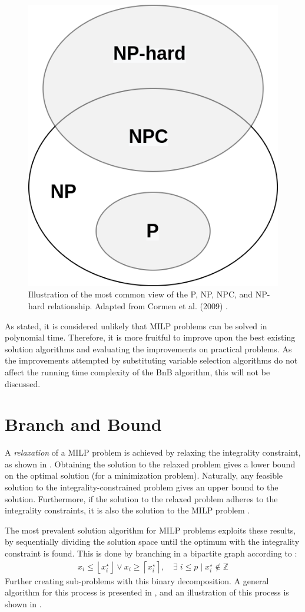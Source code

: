 \begin{figure}
    \centering
    \includegraphics[width=0.4\linewidth]{img/npc.png}
    \caption{\label{fig:np}Illustration of the most common view of the P, NP, NPC, and NP-hard relationship. Adapted from Cormen et al. (2009) \cite{cormen2009introduction}.}
\end{figure}

As stated, it is considered unlikely that \gls{MILP} problems can be solved in polynomial time. Therefore, it is more fruitful to improve upon the best existing solution algorithms and evaluating the improvements on practical problems. As the improvements attempted by substituting variable selection algorithms do not affect the running time complexity of the \gls{BnB} algorithm, this will not be discussed.  










\section{Branch and Bound}\label{sec:back_bnb}

A \textit{relaxation} of a \gls{MILP} problem is achieved by relaxing the integrality constraint, as shown in . Obtaining the solution to the relaxed problem gives a lower bound on the optimal solution (for a minimization problem). Naturally, any feasible solution to the integrality-constrained problem gives an upper bound to the solution. Furthermore, if the solution to the relaxed problem adheres to the integrality constraints, it is also the solution to the \gls{MILP} problem \cite{wolsey2020integer}.






The most prevalent solution algorithm for \gls{MILP} problems exploits these results, by sequentially dividing the solution space until the optimum with the integrality constraint is found. This is done by branching in a bipartite graph according to \cite{gasse2019exact}:
\begin{align} \label{eq:branch}
    x_{i} \leq\left\lfloor x_{i}^{\star}\right\rfloor \vee x_{i} \geq\left\lceil x_{i}^{\star}\right\rceil, \quad \exists \; i \leq p \mid x_{i}^{\star} \notin \mathbb{Z}    
\end{align}
Further creating sub-problems with this binary decomposition. A general algorithm for this process is presented in , and an illustration of this process is shown in .

